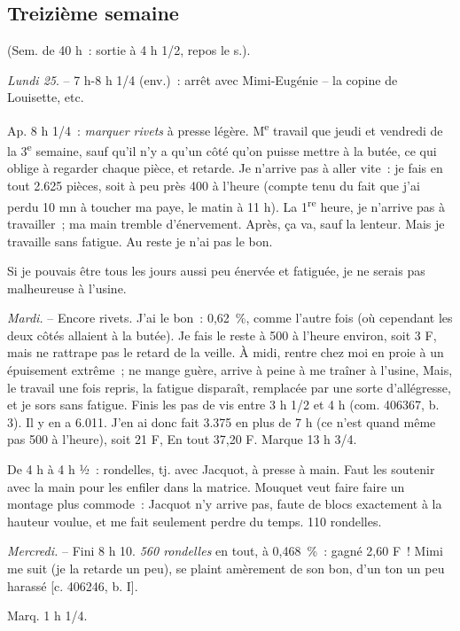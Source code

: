 \documentclass[french,twoside]{book} %
\begin{document}
\subsection[Treizième semaine]{Treizième semaine}
\noindent (Sem. de 40 h : sortie à 4 h 1/2, repos le s.).\par
{\itshape Lundi 25}. – 7 h-8 h 1/4 (env.) : arrêt avec Mimi-Eugénie – la copine de Louisette, etc.\par
Ap. 8 h 1/4 : {\itshape marquer rivets} à presse légère. M\textsuperscript{e} travail que jeudi et vendredi de la 3\textsuperscript{e} semaine, sauf qu'il n'y a qu'un côté qu'on puisse mettre à la butée, ce qui oblige à regarder chaque pièce, et retarde. Je n'arrive pas à aller vite : je fais en tout 2.625 pièces, soit à peu près 400 à l'heure (compte tenu du fait que j'ai perdu 10 mn à toucher ma paye, le matin à 11 h). La 1\textsuperscript{re} heure, je n'arrive pas à travailler ; ma main tremble d'énervement. Après, ça va, sauf la lenteur. Mais je travaille sans fatigue. Au reste je n'ai pas le bon.\par
Si je pouvais être tous les jours aussi peu énervée et fatiguée, je ne serais pas malheureuse à l'usine.\par
{\itshape Mardi.} – Encore rivets. J'ai le bon : 0,62 \%, comme l'autre fois (où cependant les deux côtés allaient à la butée). Je fais le reste à 500 à l'heure environ, soit 3 F, mais ne rattrape pas le retard de la veille. À midi, rentre chez moi en proie à un épuisement extrême ; ne mange guère, arrive à peine à me traîner à l'usine, Mais, le travail une fois repris, la fatigue disparaît, remplacée par une sorte d'allégresse, et je sors sans fatigue. Finis les pas de vis entre 3 h 1/2 et 4 h (com. 406367, b. 3). Il y en a 6.011. J'en ai donc fait 3.375 en plus de 7 h (ce n'est quand même pas 500 à l'heure), soit 21 F, En tout 37,20 F. Marque 13 h 3/4.\par
De 4 h à 4 h ½ : rondelles, tj. avec Jacquot, à presse à main. Faut les soutenir avec la main pour les enfiler dans la matrice. Mouquet veut faire faire un montage plus commode : Jacquot n'y arrive pas, faute de blocs exactement à la hauteur voulue, et me fait seulement perdre du temps. 110 rondelles.\par
{\itshape Mercredi.} – Fini 8 h 10. {\itshape 560 rondelles} en tout, à 0,468 \% : gagné 2,60 F ! Mimi me suit (je la retarde un peu), se plaint amèrement de son bon, d'un ton un peu harassé [c. 406246, b. I].\par
Marq. 1 h 1/4.\par
\end{document}
